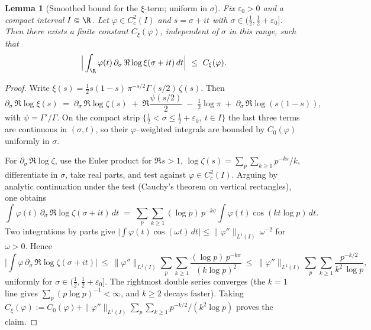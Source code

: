 \documentclass[11pt]{article}
\newtheorem{lemma}[theorem]{Lemma}
\theoremstyle{remark}
\begin{document}
\begin{lemma}[Smoothed bound for the \(\xi\)-term; uniform in \(\sigma\)]\label{lem:xi-smoothed}
Fix \(\varepsilon_0>0\) and a compact interval \(I\Subset\R\). Let \(\varphi\in C_c^2(I)\) and \(s=\sigma+it\) with \(\sigma\in(\tfrac12,\tfrac12+\varepsilon_0]\). Then there exists a finite constant \(C_\xi(\varphi)\), independent of \(\sigma\) in this range, such that
\[
 \Big|\int_{\R}\varphi(t)\,\partial_\sigma\,\Re\log\xi(\sigma+it)\,dt\Big|\ \le\ C_\xi(\varphi).
\]
\end{lemma}
\begin{proof}
Write \(\xi(s)=\tfrac12 s(1-s)\,\pi^{-s/2}\Gamma(s/2)\,\zeta(s)\). Then
\[
 \partial_\sigma\,\Re\log\xi(s)\;=\;\partial_\sigma\,\Re\log\zeta(s)\; +\; \Re\frac{\psi(s/2)}{2}\; -\; \tfrac12\log\pi\; +\; \partial_\sigma\,\Re\log(s(1-s)),
\]
with \(\psi=\Gamma'/\Gamma\). On the compact strip \(\{\tfrac12<\sigma\le\tfrac12+\varepsilon_0,\ t\in I\}\) the last three terms are continuous in \((\sigma,t)\), so their \(\varphi\)–weighted integrals are bounded by \(C_0(\varphi)\) uniformly in \(\sigma\).

For \(\partial_\sigma\,\Re\log\zeta\), use the Euler product for \(\Re s>1\),
\(\log\zeta(s)=\sum_{p}\sum_{k\ge1}p^{-ks}/k\),
differentiate in \(\sigma\), take real parts, and test against \(\varphi\in C_c^2(I)\). Arguing by analytic continuation under the test (Cauchy's theorem on vertical rectangles), one obtains
\[
 \int \varphi(t)\,\partial_\sigma\,\Re\log\zeta(\sigma+it)\,dt\;=\;\sum_{p}\sum_{k\ge1} (\log p)\,p^{-k\sigma}\int \varphi(t)\cos(kt\log p)\,dt.
\]
Two integrations by parts give \(\big|\int \varphi(t)\cos(\omega t)\,dt\big|\le \|\varphi''\|_{L^1(I)}\,\omega^{-2}\) for \(\omega>0\). Hence
\[
 \Big|\int \varphi\,\partial_\sigma\,\Re\log\zeta(\sigma+it)\Big|\ \le\ \|\varphi''\|_{L^1(I)}\sum_{p}\sum_{k\ge1}\frac{(\log p)\,p^{-k\sigma}}{(k\log p)^2}\ \le\ \|\varphi''\|_{L^1(I)}\sum_{p}\sum_{k\ge1}\frac{p^{-k/2}}{k^2\,\log p},
\]
uniformly for \(\sigma\in(\tfrac12,\tfrac12+\varepsilon_0]\). The rightmost double series converges (the \(k\!=\!1\) line gives \(\sum_{p}(p\log p)^{-1}<\infty\), and \(k\ge2\) decays faster). Taking \(C_\xi(\varphi):=C_0(\varphi)+\|\varphi''\|_{L^1(I)}\sum_{p}\sum_{k\ge1}p^{-k/2}/(k^2\log p)\) proves the claim.
\end{proof}
\end{document}
